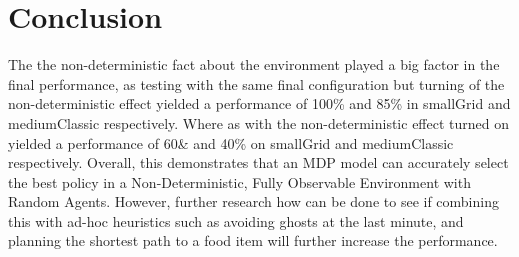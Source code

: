 \documentclass[letterpaper, 11pt, journal, final]{IEEEtran}
\begin{document}
\section{Conclusion}
The the non-deterministic fact about the environment played a big factor in the final performance, as testing with the same final configuration but turning of the non-deterministic effect yielded a performance of 100\% and 85\% in smallGrid and mediumClassic respectively. Where as with the non-deterministic effect turned on yielded a performance of 60\& and 40\% on smallGrid and mediumClassic respectively. Overall, this demonstrates that an MDP model can accurately select the best policy in a Non-Deterministic, Fully Observable Environment with Random Agents. However, further research how can be done to see if combining this with ad-hoc heuristics such as avoiding ghosts at the last minute, and planning the shortest path to a food item will further increase the performance.



\end{document}
